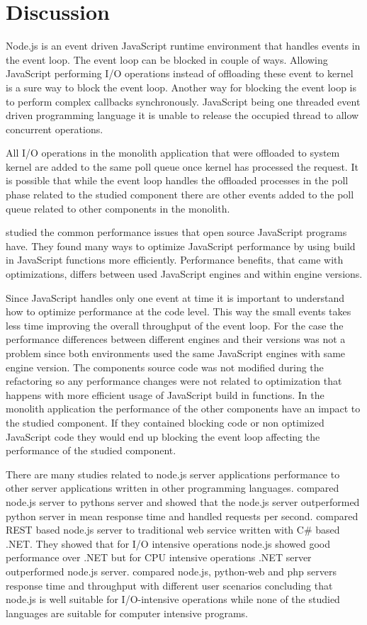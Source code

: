 \chapter{Discussion\label{discussion}}
Node.js is an event driven JavaScript runtime environment that handles events in the event loop.
The event loop can be blocked in couple of ways.
Allowing JavaScript performing I/O operations instead of offloading these event to kernel is a sure way to block the event loop.
Another way for blocking the event loop is to perform complex callbacks synchronously.
JavaScript being one threaded event driven programming language it is unable to release the occupied thread to allow concurrent operations.

All I/O operations in the monolith application that were offloaded to system kernel are added to the same poll queue once kernel has processed the request.
It is possible that while the event loop handles the offloaded processes in the poll phase related to the studied component there are other events added to the poll queue related to other components in the monolith.

\cite{SelakovicPerformanceIssues} studied the common performance issues that open source JavaScript programs have.
They found many ways to optimize JavaScript performance by using build in JavaScript functions more efficiently.
Performance benefits, that came with optimizations, differs between used JavaScript engines and within engine versions.

Since JavaScript handles only one event at time it is important to understand how to optimize performance at the code level.
This way the small events takes less time improving the overall throughput of the event loop.
For the case the performance differences between different engines and their versions was not a problem since both environments used the same JavaScript engines with same engine version.
The components source code was not modified during the refactoring so any performance changes were not related to optimization that happens with more efficient usage of JavaScript build in functions.
In the monolith application the performance of the other components have an impact to the studied component.
If they contained blocking code or non optimized JavaScript code they would end up blocking the event loop affecting the performance of the studied component.

There are many studies related to node.js server applications performance to other server applications written in other programming languages.
\cite{Challapalli} compared node.js server to pythons server and showed that the node.js server outperformed python server in mean response time and handled requests per second.
\cite{Chitra} compared REST based node.js server to traditional web service written with C\# based .NET.
They showed that for I/O intensive operations node.js showed good performance over .NET but
for CPU intensive operations .NET server outperformed node.js server.
\cite{Lei} compared node.js, python-web and php servers response time and throughput with different user scenarios concluding that node.js is well suitable for I/O-intensive operations while none of the studied languages are suitable for computer intensive programs.

